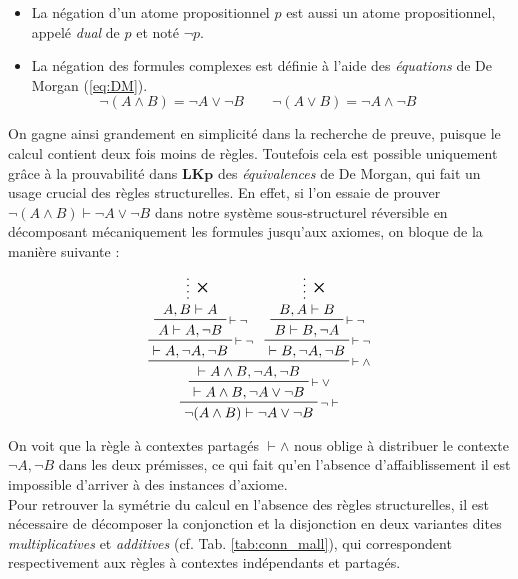 \documentclass[12pt]{report}
\newcommand{\seq}{\vdash}
\newcommand{\irule}[1]{\footnotesize$#1$}
\newcommand{\iruleL}[1]{\irule{{#1}\seq}}
\newcommand{\iruleR}[1]{\irule{\seq{#1}}}
\begin{document}
\begin{itemize}
    \item La négation d'un atome propositionnel $p$ est aussi un atome propositionnel, appelé \emph{dual} de $p$ et noté $\neg p$.
    \item La négation des formules complexes est définie à l'aide des \emph{équations} de De Morgan (\ref{eq:DM}).
        \begin{equation} \label{eq:DM}
            \neg (A \land B) = \neg A \lor \neg B \qquad \neg (A \lor B) = \neg A \land \neg B \qquad
        \end{equation}
\end{itemize}

On gagne ainsi grandement en simplicité dans la recherche de preuve, puisque le calcul contient deux fois moins de règles. Toutefois cela est possible uniquement grâce à la prouvabilité dans $\mathbf{LKp}$ des \emph{équivalences} de De Morgan, qui fait un usage crucial des règles structurelles. En effet, si l'on essaie de prouver $\neg (A \land B) \seq \neg A \lor \neg B$ dans notre système sous-structurel réversible en décomposant mécaniquement les formules jusqu'aux axiomes, on bloque de la manière suivante :

\begin{displaymath}
    \prftree[r]{\iruleL{\neg}}
        {\prftree[r]{\iruleR{\lor}}
            {\prftree[r]{\iruleR{\land}}
                {\prftree[r]{\iruleR{\neg}}
                    {\prftree[r]{\iruleR{\neg}}
                        {\prfsummary[\ding{53}]{A,B \seq A}}
                        {A \seq A,\neg B}}
                    {\seq A,\neg A,\neg B}}
                {\prftree[r]{\iruleR{\neg}}
                    {\prftree[r]{\iruleR{\neg}}
                        {\prfsummary[\ding{53}]{B,A \seq B}}
                        {B \seq B,\neg A}}
                    {\seq B,\neg A,\neg B}}
                {\seq A \land B,\neg A,\neg B}}
            {\seq A \land B,\neg A \lor \neg B}}
        {\neg (A \land B) \seq \neg A \lor \neg B}
\end{displaymath}

On voit que la règle à contextes partagés {\iruleR{\land}} nous oblige à distribuer le contexte $\neg A,\neg B$ dans les deux prémisses, ce qui fait qu'en l'absence d'affaiblissement il est impossible d'arriver à des instances d'axiome.\\

Pour retrouver la symétrie du calcul en l'absence des règles structurelles, il est nécessaire de décomposer la conjonction et la disjonction en deux variantes dites \emph{multiplicatives} et \emph{additives} (cf. Tab. \ref{tab:conn_mall}), qui correspondent respectivement aux règles à contextes indépendants et partagés.
\end{document}
